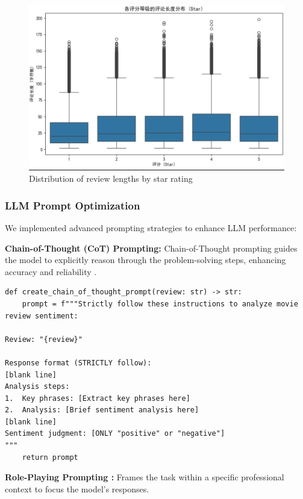 \documentclass{article}
\begin{document}
\begin{figure}[h]
    \centering
    \includegraphics[width=1\columnwidth]{pic/T2P2B1.3.png}
    \caption{Distribution of review lengths by star rating}
    \label{fig:length_analysis}
\end{figure}

\subsubsection{LLM Prompt Optimization}
\label{sssec:prompt_optimization}

We implemented advanced prompting strategies to enhance LLM performance:

\textbf{Chain-of-Thought (CoT) Prompting:}
Chain-of-Thought prompting guides the model to explicitly reason through the problem-solving steps, 
enhancing accuracy and reliability \cite{Wei2022}. 

\begin{lstlisting}[caption={Chain-of-Thought prompt design}]
def create_chain_of_thought_prompt(review: str) -> str:
    prompt = f"""Strictly follow these instructions to analyze movie review sentiment:

Review: "{review}"

Response format (STRICTLY follow):
[blank line]
Analysis steps:
1.  Key phrases: [Extract key phrases here]
2.  Analysis: [Brief sentiment analysis here]
[blank line]
Sentiment judgment: [ONLY "positive" or "negative"]
"""
    return prompt
\end{lstlisting}

\textbf{Role-Playing Prompting \cite{Shan2023} :}
Frames the task within a specific professional context to focus the model's responses.
\end{document}
